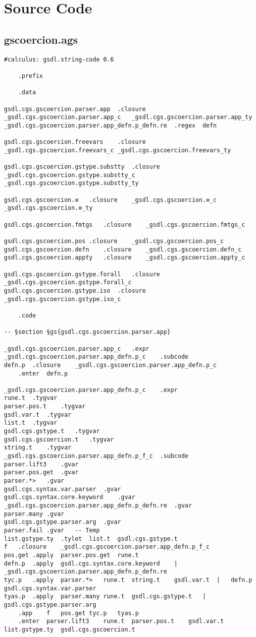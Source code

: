 \documentclass{report}
\begin{document}
\chapter{Source Code}

\section{gscoercion.ags}

\begin{verbatim}
#calculus: gsdl.string-code 0.6

	.prefix

	.data

gsdl.cgs.gscoercion.parser.app	.closure	_gsdl.cgs.gscoercion.parser.app_c	_gsdl.cgs.gscoercion.parser.app_ty
_gsdl.cgs.gscoercion.parser.app_defn.p_defn.re	.regex	defn

gsdl.cgs.gscoercion.freevars	.closure	_gsdl.cgs.gscoercion.freevars_c	_gsdl.cgs.gscoercion.freevars_ty

gsdl.cgs.gscoercion.gstype.substty	.closure	_gsdl.cgs.gscoercion.gstype.substty_c	_gsdl.cgs.gscoercion.gstype.substty_ty

gsdl.cgs.gscoercion.≡	.closure	_gsdl.cgs.gscoercion.≡_c	_gsdl.cgs.gscoercion.≡_ty

gsdl.cgs.gscoercion.fmtgs	.closure	_gsdl.cgs.gscoercion.fmtgs_c

gsdl.cgs.gscoercion.pos	.closure	_gsdl.cgs.gscoercion.pos_c
gsdl.cgs.gscoercion.defn	.closure	_gsdl.cgs.gscoercion.defn_c
gsdl.cgs.gscoercion.appty	.closure	_gsdl.cgs.gscoercion.appty_c

gsdl.cgs.gscoercion.gstype.forall	.closure	_gsdl.cgs.gscoercion.gstype.forall_c
gsdl.cgs.gscoercion.gstype.iso	.closure	_gsdl.cgs.gscoercion.gstype.iso_c

	.code

-- §section §gs{gsdl.cgs.gscoercion.parser.app}

_gsdl.cgs.gscoercion.parser.app_c	.expr
_gsdl.cgs.gscoercion.parser.app_defn.p_c	.subcode
defn.p	.closure	_gsdl.cgs.gscoercion.parser.app_defn.p_c
	.enter	defn.p

_gsdl.cgs.gscoercion.parser.app_defn.p_c	.expr
rune.t	.tygvar
parser.pos.t	.tygvar
gsdl.var.t	.tygvar
list.t	.tygvar
gsdl.cgs.gstype.t	.tygvar
gsdl.cgs.gscoercion.t	.tygvar
string.t	.tygvar
_gsdl.cgs.gscoercion.parser.app_defn.p_f_c	.subcode
parser.lift3	.gvar
parser.pos.get	.gvar
parser.*>	.gvar
gsdl.cgs.syntax.var.parser	.gvar
gsdl.cgs.syntax.core.keyword	.gvar
_gsdl.cgs.gscoercion.parser.app_defn.p_defn.re	.gvar
parser.many	.gvar
gsdl.cgs.gstype.parser.arg	.gvar
parser.fail	.gvar	-- Temp
list.gstype.ty	.tylet	list.t	gsdl.cgs.gstype.t
f	.closure	_gsdl.cgs.gscoercion.parser.app_defn.p_f_c
pos.get	.apply	parser.pos.get	rune.t
defn.p	.apply	gsdl.cgs.syntax.core.keyword	|	_gsdl.cgs.gscoercion.parser.app_defn.p_defn.re
tyc.p	.apply	parser.*>	rune.t	string.t	gsdl.var.t	|	defn.p	gsdl.cgs.syntax.var.parser
tyas.p	.apply	parser.many	rune.t	gsdl.cgs.gstype.t	|	gsdl.cgs.gstype.parser.arg
	.app	f	pos.get	tyc.p	tyas.p
	.enter	parser.lift3	rune.t	parser.pos.t	gsdl.var.t	list.gstype.ty	gsdl.cgs.gscoercion.t


\end{verbatim}
\end{document}
